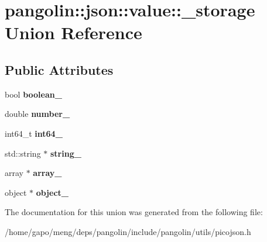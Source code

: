 \hypertarget{unionpangolin_1_1json_1_1value_1_1__storage}{}\section{pangolin\+:\+:json\+:\+:value\+:\+:\+\_\+storage Union Reference}
\label{unionpangolin_1_1json_1_1value_1_1__storage}
\subsection*{Public Attributes}
\begin{DoxyCompactItemize}
\item 
bool {\bfseries boolean\+\_\+}\hypertarget{unionpangolin_1_1json_1_1value_1_1__storage_af76f03d0b591b7fbf1e7ee1eb2b396a9}{}\label{unionpangolin_1_1json_1_1value_1_1__storage_af76f03d0b591b7fbf1e7ee1eb2b396a9}

\item 
double {\bfseries number\+\_\+}\hypertarget{unionpangolin_1_1json_1_1value_1_1__storage_aaed7a618c2146aee15d57f429cf6d6aa}{}\label{unionpangolin_1_1json_1_1value_1_1__storage_aaed7a618c2146aee15d57f429cf6d6aa}

\item 
int64\+\_\+t {\bfseries int64\+\_\+}\hypertarget{unionpangolin_1_1json_1_1value_1_1__storage_a654d208654d75ca9aa600a401771ea25}{}\label{unionpangolin_1_1json_1_1value_1_1__storage_a654d208654d75ca9aa600a401771ea25}

\item 
std\+::string $\ast$ {\bfseries string\+\_\+}\hypertarget{unionpangolin_1_1json_1_1value_1_1__storage_a598cc31ca39f99e39cb7d52bf21f70af}{}\label{unionpangolin_1_1json_1_1value_1_1__storage_a598cc31ca39f99e39cb7d52bf21f70af}

\item 
array $\ast$ {\bfseries array\+\_\+}\hypertarget{unionpangolin_1_1json_1_1value_1_1__storage_a166747a6f8671f27d1214cf4ba0679dc}{}\label{unionpangolin_1_1json_1_1value_1_1__storage_a166747a6f8671f27d1214cf4ba0679dc}

\item 
object $\ast$ {\bfseries object\+\_\+}\hypertarget{unionpangolin_1_1json_1_1value_1_1__storage_a74e3b5338f5dce8999187e9b1a177f9a}{}\label{unionpangolin_1_1json_1_1value_1_1__storage_a74e3b5338f5dce8999187e9b1a177f9a}

\end{DoxyCompactItemize}


The documentation for this union was generated from the following file\+:\begin{DoxyCompactItemize}
\item 
/home/gapo/meng/deps/pangolin/include/pangolin/utils/picojson.\+h\end{DoxyCompactItemize}
